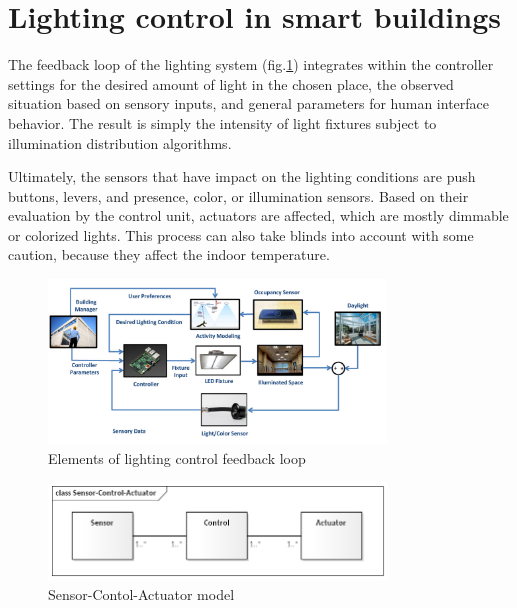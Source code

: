 \documentclass[11pt, english, a4paper, twoside]{article}
\begin{document}
\section{Lighting control in smart buildings}  \label{lighting-control}
The feedback loop of the lighting system (fig.\ref{fig:feedback-control}) integrates within the controller settings for the desired amount of light in the chosen place, the observed situation based on sensory inputs, and general parameters for human interface behavior. The result is simply the intensity of light fixtures subject to illumination distribution algorithms. 

Ultimately, the sensors that have impact on the lighting conditions are push buttons, levers, and presence, color, or illumination sensors. Based on their evaluation by the control unit, actuators are affected, which are mostly dimmable or colorized lights. This process can also take blinds into account with some caution, because they affect the indoor temperature.

\begin{figure}
	\centering
	\includegraphics[width=0.8\textwidth]{Feedback-control-loop.png}
	\caption{Elements of lighting control feedback loop \cite{imam_experimental_2016}}
	\label{fig:feedback-control}
\end{figure}
\begin{figure}
         \centering
         \includegraphics[width=0.8\textwidth]{Sensor-Control-Actuator.png}
         \caption{Sensor-Contol-Actuator model}
         \label{fig:sensor-actuator-model}
\end{figure}
\end{document}
